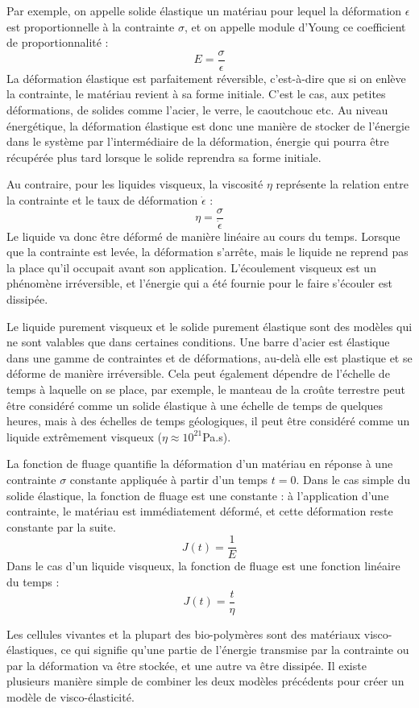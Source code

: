 \documentclass{report}
\begin{document}
Par exemple, on appelle solide élastique un matériau pour lequel la déformation $\epsilon$ est proportionnelle à la contrainte $ \sigma$, et on appelle module d'Young ce coefficient de proportionnalité : 
$$ E = \frac{\sigma}{\epsilon}$$
La déformation élastique est parfaitement réversible, c'est-à-dire que si on enlève la contrainte, le matériau revient à sa forme initiale. C'est le cas, aux petites déformations, de solides comme l'acier, le verre, le caoutchouc etc. Au niveau énergétique, la déformation élastique est donc une manière de stocker de l'énergie dans le système par l'intermédiaire de la déformation, énergie qui pourra être récupérée plus tard lorsque le solide reprendra sa forme initiale. 

Au contraire, pour les liquides visqueux, la viscosité $\eta$ représente la relation entre la contrainte et le taux de déformation $\dot{\epsilon}$ : 
$$ \eta=\frac{\sigma}{\dot{\epsilon}}$$
Le liquide va donc être déformé de manière linéaire au cours du temps. Lorsque que la contrainte est levée, la déformation s'arrête, mais le liquide ne reprend pas la place qu'il occupait avant son application. 
L'écoulement visqueux est un phénomène irréversible, et l'énergie qui a été fournie pour le faire s'écouler est dissipée. 

Le liquide purement visqueux et le solide purement élastique sont des modèles qui ne sont valables que dans certaines conditions. Une barre d'acier est élastique dans une gamme de contraintes et de déformations, au-delà elle est plastique et se déforme de manière irréversible. Cela peut également dépendre de l'échelle de temps à laquelle on se place, par exemple, le manteau de la croûte terrestre peut être considéré comme un solide élastique à une échelle de temps de quelques heures, mais à des échelles de temps géologiques, il peut être considéré comme un liquide extrêmement visqueux ($\eta \approx 10^{21}$Pa.s). 


La fonction de fluage quantifie la déformation d'un matériau en réponse à une contrainte $\sigma$ constante appliquée à partir d'un temps $t=0$. 
Dans le cas simple du solide élastique, la fonction de fluage est une constante : à l'application d'une contrainte, le matériau est immédiatement déformé, et cette déformation reste constante par la suite. 
$$J(t)=\frac{1}{E}$$
Dans le cas d'un liquide visqueux, la fonction de fluage est une fonction linéaire du temps : 
$$ J(t)=\frac{t}{\eta}$$

Les cellules vivantes et la plupart des bio-polymères sont des matériaux visco-élastiques, ce qui signifie qu'une partie de l'énergie transmise par la contrainte ou par la déformation va être stockée, et une autre va être dissipée. Il existe plusieurs manière simple de combiner les deux modèles précédents pour créer un modèle de visco-élasticité. 
\end{document}
